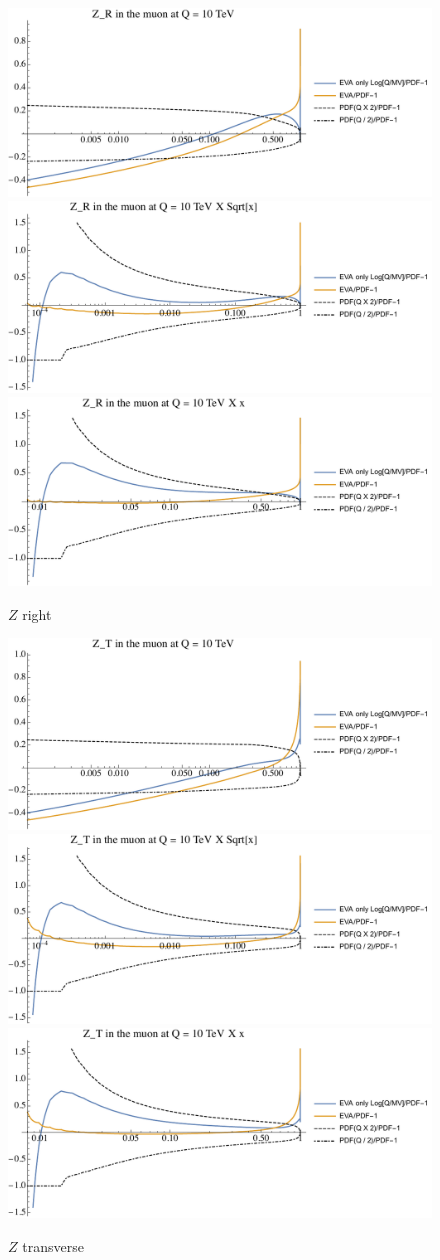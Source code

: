 \documentclass[a4paper,11pt]{article}
\begin{document}
\begin{figure}[!b]
\includegraphics[width=0.46\linewidth]{Notebooks/PlotPDFs/ratios/10TeV/Z_R_Q.pdf}
\includegraphics[width=0.46\linewidth]{Notebooks/PlotPDFs/ratios/10TeV/Z_R_Qsqrtx.pdf}
\includegraphics[width=0.46\linewidth]{Notebooks/PlotPDFs/ratios/10TeV/Z_R_Qx.pdf}
\caption{$Z$ right}
\end{figure}

\begin{figure}[!b]
\includegraphics[width=0.46\linewidth]{Notebooks/PlotPDFs/ratios/10TeV/Z_T_Q.pdf}
\includegraphics[width=0.46\linewidth]{Notebooks/PlotPDFs/ratios/10TeV/Z_T_Qsqrtx.pdf}
\includegraphics[width=0.46\linewidth]{Notebooks/PlotPDFs/ratios/10TeV/Z_T_Qx.pdf}
\caption{$Z$ transverse}
\end{figure}
\end{document}
